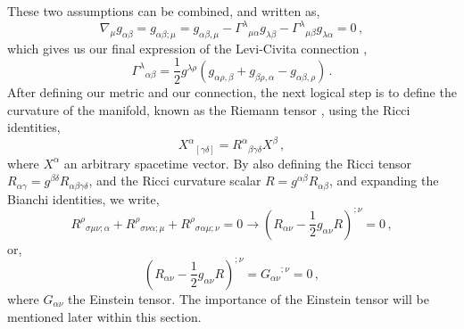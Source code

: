 \documentclass{book}
\begin{document}
	These two assumptions can be combined, and written as,
	\begin{equation}
		\label{christofell_derivation}
		\nabla_\mu g_{\alpha\beta}=g_{\alpha\beta;\mu}=g_{\alpha\beta,\mu}-{\Gamma^\lambda}_{\mu\alpha}g_{\lambda\beta}-{\Gamma^\lambda}_{\mu\beta}g_{\lambda\alpha}=0 \, ,  
	\end{equation}
	which gives us our final expression of the Levi-Civita connection \cite{Lee2019IntroductionTR, Clifton_2012},
	\begin{equation}
		\label{Christofell_2}
		{\Gamma^\lambda}_{\alpha\beta}=\frac12 g^{\lambda \rho}(g_{\alpha\rho,\beta}+g_{\beta\rho,\alpha}-g_{\alpha\beta,\rho}) \, .
	\end{equation}
	After defining our metric and our connection, the next logical step is to define the curvature of the manifold, known as the Riemann tensor \cite{2021}, using the Ricci identities,
	\begin{equation}
		\label{Riemann_tensor_defining}
		{X^\alpha}_{\left[\gamma\delta\right]}={R^\alpha}_{\beta\gamma\delta}X^\beta \,,
	\end{equation}
	where $X^\alpha$ an arbitrary spacetime vector. By also defining the Ricci tensor $R_{\alpha\gamma}=g^{\beta\delta}R_{\alpha\beta\gamma\delta}$, and the Ricci curvature scalar $R=g^{\alpha\beta}R_{\alpha\beta}$, and expanding the Bianchi identities, we write,
	\begin{equation}
		\label{bianchi_identities}
		{R^\rho}_{\sigma\mu\nu;\alpha} + {R^\rho}_{\sigma\nu\alpha;\mu}+{R^\rho}_{\sigma\alpha\mu;\nu}=0 \rightarrow \left( R_{\alpha\nu}-\frac12 g_{\alpha\nu}R \right)^{;\nu}=0 \, ,
	\end{equation}
	or,
	\begin{equation}
		\label{einstein_tensor}
		\left( R_{\alpha\nu}-\frac12 g_{\alpha\nu}R \right)^{;\nu}={G_{\alpha\nu}}^{;\nu}=0 \, ,
	\end{equation}
	where $G_{\alpha\nu}$ the Einstein tensor. The importance of the Einstein tensor will be mentioned later within this section.
	
\end{document}
